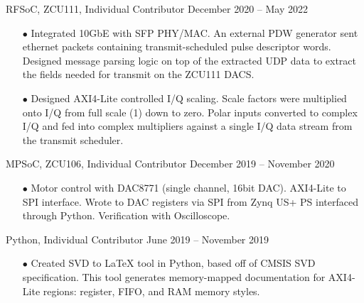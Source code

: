 \documentclass[10pt,final,sans]{resume}
\begin{document}
\begin{adjustwidth}{.3cm}{}
   { RFSoC, ZCU111, Individual Contributor } { December 2020 -- May 2022 }
  \begin{itemize}
  \item[$\bullet$] Integrated 10GbE with SFP PHY/MAC. An external PDW generator sent ethernet packets containing transmit-scheduled pulse descriptor words. Designed message parsing logic on top of the extracted UDP data to extract the fields needed for transmit on the ZCU111 DACS.
  \item[$\bullet$] Designed AXI4-Lite controlled I/Q scaling. Scale factors were multiplied onto I/Q from full scale (1) down to zero. Polar inputs converted to complex I/Q and fed into complex multipliers against a single I/Q data stream from the transmit scheduler.
\end{itemize}
\end{adjustwidth}

\begin{adjustwidth}{.3cm}{} 
   { MPSoC, ZCU106, Individual Contributor } { December 2019 -- November 2020 }
  \begin{itemize}
  \item[$\bullet$] Motor control with DAC8771 (single channel, 16bit DAC). AXI4-Lite to SPI interface. Wrote to DAC registers via SPI from Zynq US+ PS interfaced through Python. Verification with Oscilloscope.
  \end{itemize}
\end{adjustwidth}

\begin{adjustwidth}{.3cm}{}
   {Python, Individual Contributor } { June 2019 -- November 2019 }
  \begin{itemize}
  \item[$\bullet$] Created SVD to LaTeX tool in Python, based off of CMSIS SVD specification. This tool generates memory-mapped documentation for AXI4-Lite regions: register, FIFO, and RAM memory styles.
  \end{itemize}
\end{adjustwidth}

\vfill
\end{document}
